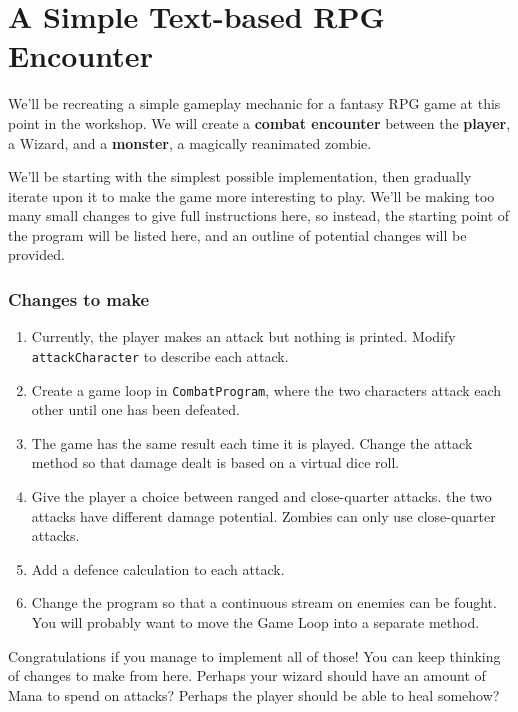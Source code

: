 \section{A Simple Text-based RPG Encounter}

	We'll be recreating a simple gameplay mechanic for a fantasy RPG game at this point in the workshop. We will create a \textbf{combat encounter} between the \textbf{player}, a Wizard, and a \textbf{monster}, a magically reanimated zombie.
	
	We'll be starting with the simplest possible implementation, then gradually iterate upon it to make the game more interesting to play. We'll be making too many small changes to give full instructions here, so instead, the starting point of the program will be listed here, and an outline of potential changes will be provided.
	
	
	
	
	\subsubsection{Changes to make}
	
		\begin{enumerate}
			\item Currently, the player makes an attack but nothing is printed. Modify \texttt{attackCharacter} to describe each attack.
			\item Create a game loop in \texttt{CombatProgram}, where the two characters attack each other until one has been defeated.
			\item The game has the same result each time it is played. Change the attack method so that damage dealt is based on a virtual dice roll.
			\item Give the player a choice between ranged and close-quarter attacks. the two attacks have different damage potential. Zombies can only use close-quarter attacks.
			\item Add a defence calculation to each attack.
			\item Change the program so that a continuous stream on enemies can be fought. You will probably want to move the Game Loop into a separate method.
		\end{enumerate}
	
	Congratulations if you manage to implement all of those! You can keep thinking of changes to make from here. Perhaps your wizard should have an amount of Mana to spend on attacks? Perhaps the player should be able to heal somehow?

